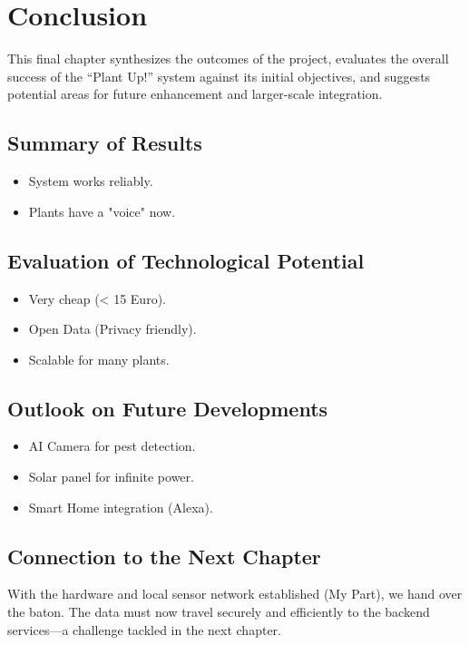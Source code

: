 \section{Conclusion}

This final chapter synthesizes the outcomes of the project, evaluates the overall success of the ``Plant Up!'' system against its initial objectives, and suggests potential areas for future enhancement and larger-scale integration.

\subsection{Summary of Results}
\begin{itemize}
    \item System works reliably.
    \item Plants have a "voice" now.
\end{itemize}

\subsection{Evaluation of Technological Potential}
\begin{itemize}
    \item Very cheap (< 15 Euro).
    \item Open Data (Privacy friendly).
    \item Scalable for many plants.
\end{itemize}

\subsection{Outlook on Future Developments}
\begin{itemize}
    \item AI Camera for pest detection.
    \item Solar panel for infinite power.
    \item Smart Home integration (Alexa).
\end{itemize}

\subsection{Connection to the Next Chapter}
With the hardware and local sensor network established (My Part), we hand over the baton. The data must now travel securely and efficiently to the backend services—a challenge tackled in the next chapter.
